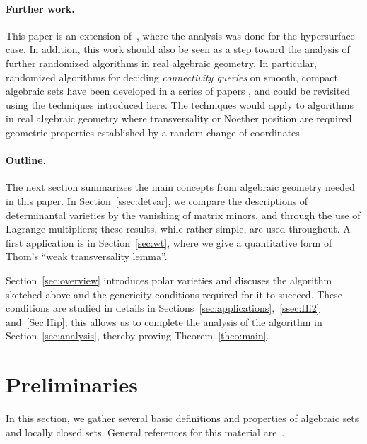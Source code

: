 \documentclass[12pt]{article}
\begin{document}
\paragraph*{Further work.}
This paper is an extension of~\cite{ElGiSc20}, where the analysis was
done for the hypersurface case. In addition, this work should also be
seen as a step toward the analysis of further randomized algorithms in
real algebraic geometry.  In particular, randomized algorithms for
deciding {\em connectivity queries} on smooth, compact algebraic sets
have been developed in a series of papers
\cite{SchostMohabBabySteps2011,SchostMohabBabySteps2014}, and could be
revisited using the techniques introduced here. The techniques would
apply to algorithms in real algebraic geometry where transversality or
Noether position are required geometric properties established by a
random change of coordinates.

\paragraph*{Outline.} The next section summarizes the main concepts from 
algebraic geometry needed in this paper. In Section~\ref{ssec:detvar},
we compare the descriptions of determinantal varieties by the
vanishing of matrix minors, and through the use of Lagrange
multipliers; these results, while rather simple, are used throughout.
A first application is in Section~\ref{sec:wt}, where we give a
quantitative form of Thom's ``weak transversality lemma''.

Section~\ref{sec:overview} introduces polar varieties and discuses the
algorithm sketched above and the genericity conditions required for it
to succeed. These conditions are studied in details in
Sections~\ref{sec:applications},~\ref{ssec:Hi2} and~\ref{Sec:Hip};
this allows us to complete the analysis of the algorithm in
Section~\ref{sec:analysis}, thereby proving Theorem~\ref{theo:main}.


\section{Preliminaries}

In this section, we gather several basic definitions and properties of
algebraic sets and locally closed sets. General references for this
material are~\cite{Mumford76,Shafarevich77,ECA}.
\end{document}
